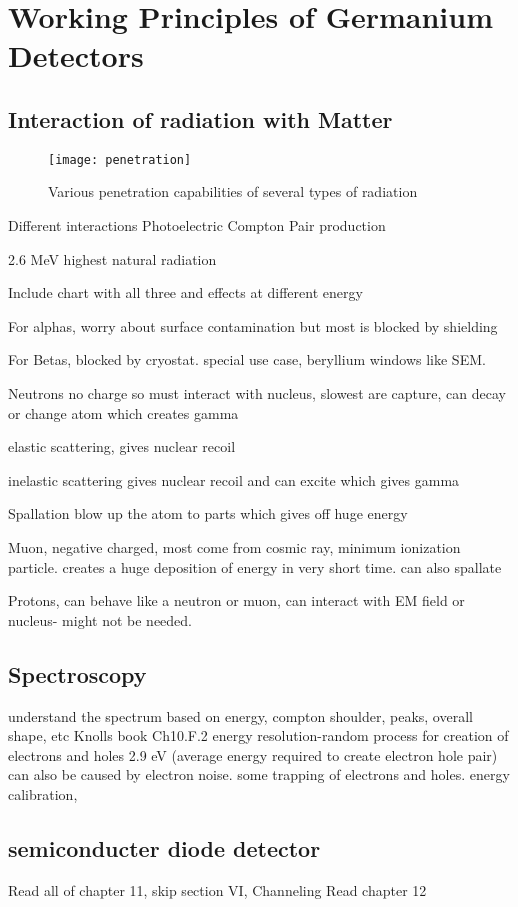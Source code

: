 \chapter{Working Principles of Germanium Detectors}

\section{Interaction of radiation with Matter}
\begin{figure}[htpb]
\centering
\texttt{[image: penetration]}
\caption{Various penetration capabilities of several types of radiation}
\label{fig:penetration}
\end{figure}

Different interactions
Photoelectric
Compton
Pair production

2.6 MeV highest natural radiation

Include chart with all three and effects at different energy

For alphas, worry about surface contamination but most is blocked by shielding

For Betas, blocked by cryostat. special use case, beryllium windows like SEM.

Neutrons no charge so must interact with nucleus, slowest are capture, can decay or change atom which creates gamma

elastic scattering, gives nuclear recoil

inelastic scattering gives nuclear recoil and can excite which gives gamma

Spallation blow up the atom to parts which gives off huge energy

Muon, negative charged, most come from cosmic ray, minimum ionization particle. creates a huge deposition of energy in very short time. can also spallate

Protons, can behave like a neutron or muon, can interact with EM field or nucleus- might not be needed.

\section{Spectroscopy}

understand the spectrum based on energy, compton shoulder, peaks, overall shape, etc Knolls book Ch10.F.2
energy resolution-random process for creation of electrons and holes 2.9 eV (average energy required to create electron hole pair) can also be caused by electron noise. some trapping of electrons and holes.
energy calibration,

\section{semiconducter diode detector}
Read all of chapter 11, skip section VI, Channeling
Read chapter 12
